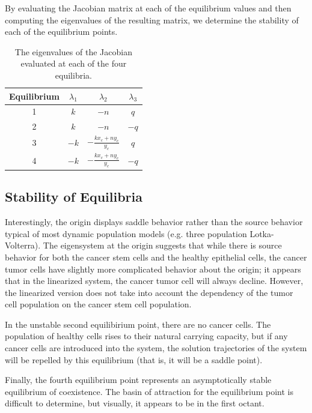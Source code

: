 \documentclass[12pt]{article}
\begin{document}
By evaluating the Jacobian matrix at each of the equilibrium values and then computing the eigenvalues of the resulting matrix, we determine the stability of each of the equilibrium points.

\begin{table}[h!]
\centering
\caption{The eigenvalues of the Jacobian evaluated at each of the four equilibria.}
\begin{tabular}{|c|c|c|c|}
\hline
Equilibrium & \(\lambda_1\) & \(\lambda_2\) & \(\lambda_3\)\\
\hline
\hline
1 & $k$ & $-n$ & $q$ \\
\hline
2 & $k$ & $-n$ & $-q$ \\
\hline
3 & $-k$ & $-\frac{kx_c+ny_c}{y_c}$ & $q$ \\
\hline
4 & $-k$ & $-\frac{kx_c+ny_c}{y_c}$ & $-q$ \\
\hline
\end{tabular}
\label{t:notreatmenteigs}
\end{table}

\subsection{Stability of Equilibria}
\indent\indent Interestingly, the origin displays saddle behavior rather than the source behavior typical of most dynamic population models (e.g. three population Lotka-Volterra). The eigensystem at the origin suggests that while there is source behavior for both the cancer stem cells and the healthy epithelial cells, the cancer tumor cells have slightly more complicated behavior about the origin; it appears that in the linearized system, the cancer tumor cell will always decline. However, the linearized version does not take into account the dependency of the tumor cell population on the cancer stem cell population.

In the unstable second equilibirium point, there are no cancer cells. The population of healthy cells rises to their natural carrying capacity, but if any cancer cells are introduced into the system, the solution trajectories of the system will be repelled by this equilibrium (that is, it will be a saddle point).

Finally, the fourth equilibrium point represents an asymptotically stable equilibrium of coexistence. The basin of attraction for the equilibrium point is difficult to determine, but visually, it appears to be in the first octant. 
\end{document}
